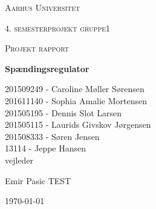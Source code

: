 \thispagestyle{empty}
	{\centering
	{\scshape\LARGE Aarhus Universitet \par}
	\vspace{1cm}
	{\scshape\Large 4. semesterprojekt gruppe1\par}
	{\scshape\Large Projekt rapport\par}
	\vspace{1.5cm}
	{\huge\bfseries Spændingsregulator\par}
	\vspace{2cm}
	{\Large
	201509249 - Caroline Møller Sørensen\\
	201611140 - Sophia Amalie Mortensen\\
	201505195 - Dennis Slot Larsen \\
	201505115 - Laurids Givskov Jørgensen\\
	201508333 - Søren Jensen\\
	13114 - Jeppe Hansen\\   }
	\vfill
	vejleder\par
	Emir Pasic TEST

	\vfill

	{\large \today\par}
\par}

